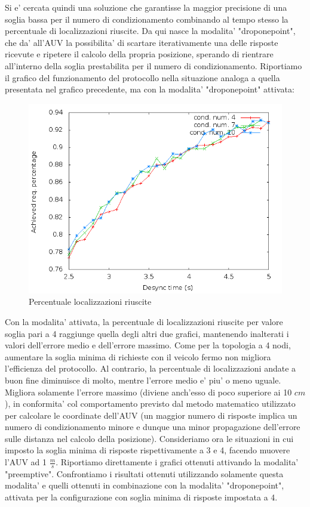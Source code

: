 \documentclass[Lau,binding=0.6cm]{sapthesis}
\begin{document}
Si e' cercata quindi una soluzione che garantisse la maggior precisione di una soglia bassa per il numero di condizionamento combinando al tempo stesso la percentuale di localizzazioni riuscite.
Da qui nasce la modalita' "droponepoint", che da' all'AUV la possibilita' di scartare iterativamente una delle risposte ricevute e ripetere il calcolo della propria posizione, sperando di rientrare all'interno della soglia prestabilita per il numero di condizionamento. Riportiamo il grafico del funzionamento del protocollo nella situazione analoga a quella presentata nel grafico precedente, ma con la modalita' "droponepoint" attivata:
\begin{figure}[H]
    \centering
    \includegraphics[scale=0.5]{hexagonsimulation/achievedlocreq3preempt0drop1speed0.png}
    \caption{Percentuale localizzazioni riuscite}
    \label{fig:hexagonsimulation/achievedlocreq3preempt0drop1speed0}
\end{figure}
Con la modalita' attivata, la percentuale di localizzazioni riuscite per valore soglia pari a 4 raggiunge quella degli altri due grafici, mantenendo inalterati i valori dell'errore medio e dell'errore massimo. 
Come per la topologia a 4 nodi, aumentare la soglia minima di richieste con il veicolo fermo non migliora l'efficienza del protocollo. Al contrario, la percentuale di localizzazioni andate a buon fine diminuisce di molto, mentre l'errore medio e' piu' o meno uguale. Migliora solamente l'errore massimo (diviene anch'esso di poco superiore ai 10 $cm$), in conformita' col comportamento previsto dal metodo matematico utilizzato per calcolare le coordinate dell'AUV (un maggior numero di risposte implica un numero di condizionamento minore e dunque una minor propagazione dell'errore sulle distanza nel calcolo della posizione).
Consideriamo ora le situazioni in cui imposto la soglia minima di risposte rispettivamente a 3 e 4, facendo muovere l'AUV ad 1 $\frac{m}{s}$.
Riportiamo direttamente i grafici ottenuti attivando la modalita' "preemptive". Confrontiamo i risultati ottenuti utilizzando solamente questa modalita' e quelli ottenuti in combinazione con la modalita' "droponepoint", attivata per la configurazione con soglia minima di risposte impostata a 4.
\end{document}
